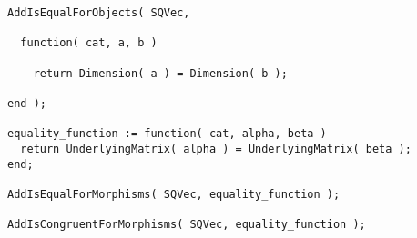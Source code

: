 \begin{small}
\begin{Verbatim}[frame=single]
AddIsEqualForObjects( SQVec,
  
  function( cat, a, b )
    
    return Dimension( a ) = Dimension( b );
  
end );

equality_function := function( cat, alpha, beta )
  return UnderlyingMatrix( alpha ) = UnderlyingMatrix( beta );
end;

AddIsEqualForMorphisms( SQVec, equality_function );

AddIsCongruentForMorphisms( SQVec, equality_function );
\end{Verbatim}
\end{small}